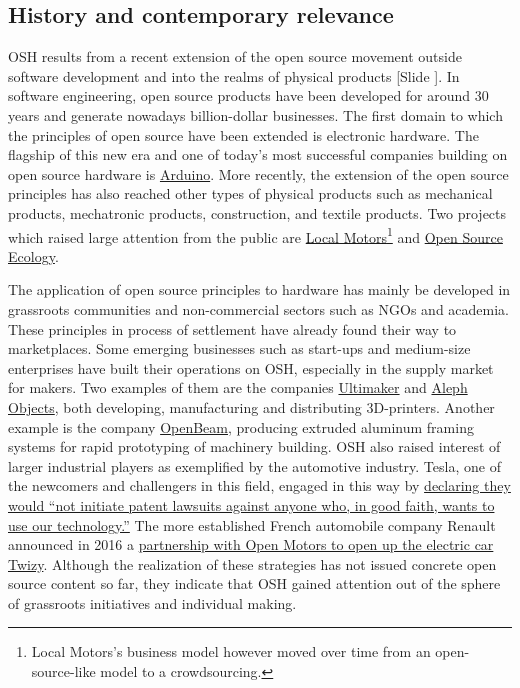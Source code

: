 \documentclass{article}
\newcounter{slide}
\begin{document}
\subsection{History and contemporary relevance}
\label{sec:OSHhistory}
OSH results from a recent extension of the open source movement outside software development and into the realms of physical products {\color{blue}[Slide ]}. In software engineering, open source products have been developed for around 30 years and generate nowadays billion-dollar businesses. The first domain to which the principles of open source have been extended is electronic hardware. The flagship of this new era and one of today's most successful companies building on open source hardware is \href{https://www.arduino.cc/}{Arduino}. More recently, the extension of the open source principles has also reached other types of physical products such as mechanical products, mechatronic products, construction, and textile products. Two projects which raised large attention from the public are \href{https://localmotors.com/}{Local Motors}\footnote{Local Motors's business model however moved over time from an open-source-like model to a crowdsourcing.} and \href{https://www.opensourceecology.org/}{Open Source Ecology}. 

The application of open source principles to hardware has mainly be developed in grassroots communities and non-commercial sectors such as NGOs and academia. These principles in process of settlement have already found their way to marketplaces. Some emerging businesses such as start-ups and medium-size enterprises have built their operations on OSH, especially in the supply market for makers. Two examples of them are the companies \href{https://ultimaker.com/}{Ultimaker} and \href{https://www.alephobjects.com/}{Aleph Objects}, both developing, manufacturing and distributing 3D-printers. Another example is the company \href{https://ztautomations.com/openbeam/}{OpenBeam}, producing extruded aluminum framing systems for rapid prototyping of machinery building. OSH also raised interest of larger industrial players as exemplified by the automotive industry. Tesla, one of the newcomers and challengers in this field, engaged in this way by \href{https://www.tesla.com/blog/all-our-patent-are-belong-you}{declaring they would ``not initiate patent lawsuits against anyone who, in good faith, wants to use our technology.''} The more established French automobile company Renault announced in 2016 a \href{https://www.openmotors.co/renaultpomsignup/}{partnership with Open Motors to open up the electric car Twizy}. Although the realization of these strategies has not issued concrete open source content so far, they indicate that OSH gained attention out of the sphere of grassroots initiatives and individual making.
\end{document}

